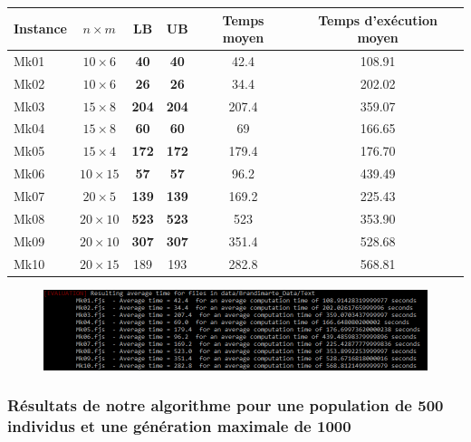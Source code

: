 \begin{table}[!h]
    \renewcommand{\arraystretch}{1.5}
    \centering
    \begin{tabular}{p{} c c c c c}
        Instance & $n \times m$ & LB & UB & Temps moyen & Temps d'exécution moyen \\
         \hline
        Mk01 & $10 \times 6$ & \textbf{40} & \textbf{40} & 42.4 & 108.91 \\
         \hline
        Mk02 & $10 \times 6$ & \textbf{26} & \textbf{26} & 34.4 & 202.02 \\
         \hline
        Mk03 & $15 \times 8$ & \textbf{204} & \textbf{204} & 207.4 & 359.07 \\
         \hline
        Mk04 & $15 \times 8$ & \textbf{60} & \textbf{60} & 69 & 166.65 \\
         \hline
        Mk05 & $15 \times 4$ & \textbf{172} & \textbf{172} & 179.4 & 176.70 \\
         \hline
        Mk06 & $10 \times 15$ & \textbf{57} & \textbf{57} & 96.2 & 439.49 \\
         \hline
        Mk07 & $20 \times 5$ & \textbf{139} & \textbf{139} & 169.2 & 225.43 \\
         \hline
        Mk08 & $20 \times 10$ & \textbf{523} & \textbf{523} & 523 & 353.90 \\
         \hline
        Mk09 & $20 \times 10$ & \textbf{307} & \textbf{307} & 351.4 & 528.68 \\
         \hline
        Mk10 & $20 \times 15$ & 189 & 193 & 282.8 & 568.81 \\
         \hline 
    \end{tabular}
\end{table}

\begin{figure}[!h]
    \centering
    \includegraphics[width=\linewidth]{report/Pictures/brandimarte_200_500.png}
\end{figure}

\subsubsection{Résultats de notre algorithme pour une population de 500 individus et une génération maximale de 1000}

